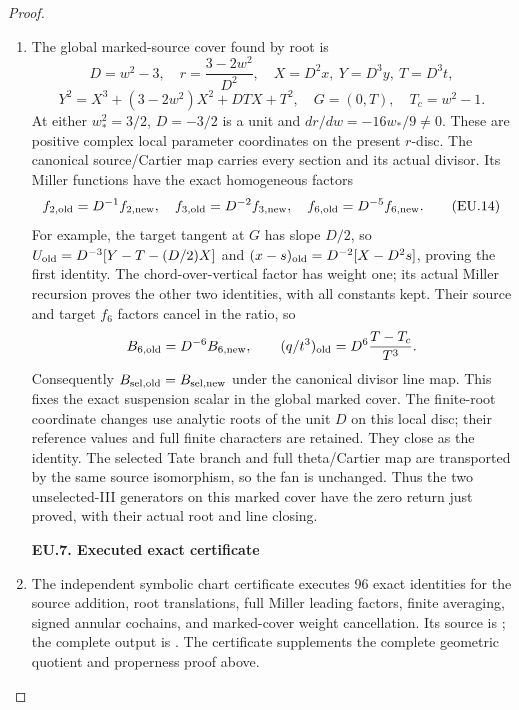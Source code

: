 \begin{proof}
\begin{enumerate}[label=\arabic*.]
\item The global marked-source cover found by root is
\[
 D=w^2-3,\quad r=\frac{3-2w^2}{D^2},\quad
 X=D^2x,\ Y=D^3y,\ T=D^3t,
\]
\[
 Y^2=X^3+(3-2w^2)X^2+DTX+T^2,\quad
 G=(0,T),\quad T_c=w^2-1.
 \tag{EU.13}
\]
At either \(w_*^2=3/2\), \(D=-3/2\) is a unit and
\(dr/dw=-16w_*/9\ne0\). These are positive complex local
parameter coordinates on the present \(r\)-disc. The canonical
source/Cartier map carries every section and its actual divisor.
Its Miller functions have the exact homogeneous factors
\[
 f_{2,\rm old}=D^{-1}f_{2,\rm new},\quad
 f_{3,\rm old}=D^{-2}f_{3,\rm new},\quad
 f_{6,\rm old}=D^{-5}f_{6,\rm new}.
 \tag{EU.14}
\]
For example, the target tangent at \(G\) has slope \(D/2\), so
\(U_{\rm old}=D^{-3}[Y-T-(D/2)X]\) and
\((x-s)_{\rm old}=D^{-2}[X-D^2s]\), proving the first identity.
The chord-over-vertical factor has weight one; its actual Miller
recursion proves the other two identities, with all constants kept.
Their source and target \(f_6\) factors cancel in the ratio, so
\[
 B_{6,\rm old}=D^{-6}B_{6,\rm new},\qquad
 (q/t^3)_{\rm old}=D^6\frac{T-T_c}{T^3}.
\]
Consequently \(B_{\rm sel,old}=B_{\rm sel,new}\) under the
canonical divisor line map. This fixes the exact suspension scalar
in the global marked cover. The finite-root coordinate changes use
analytic roots of the unit \(D\) on this local disc; their reference
values and full finite characters are retained. They close as the
identity. The selected Tate branch and full theta/Cartier map are
transported by the same source isomorphism, so the fan is unchanged.
Thus the two unselected-III generators on this marked cover have
the zero return just proved, with their actual root and line closing.

\par

\medskip\noindent\textbf{EU.7. Executed exact certificate}

\par\nobreak

\item The independent symbolic chart certificate executes 96 exact identities for the source addition, root translations, full Miller leading factors, finite averaging, signed annular cochains, and marked-cover weight cancellation. Its source is ; the complete output is . The certificate supplements the complete geometric quotient and properness proof above.

\end{enumerate}
\end{proof}